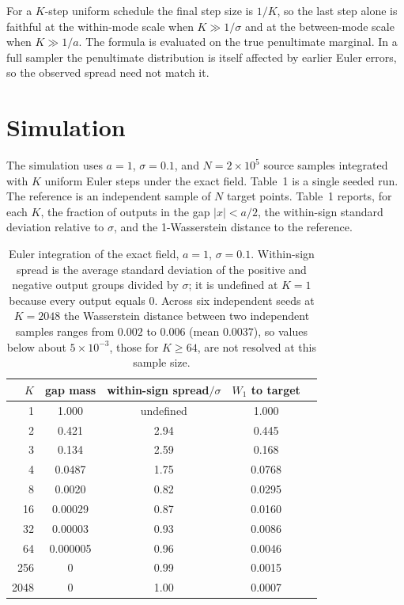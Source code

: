 \documentclass[11pt]{article}
\theoremstyle{definition}
\begin{document}
For a $K$-step uniform schedule the final step size is $1/K$, so the last step alone is faithful at the within-mode scale when $K\gg1/\sigma$ and at the between-mode scale when $K\gg1/a$. The formula is evaluated on the true penultimate marginal. In a full sampler the penultimate distribution is itself affected by earlier Euler errors, so the observed spread need not match it.

\section{Simulation}

The simulation uses $a=1$, $\sigma=0.1$, and $N=2\times10^5$ source samples integrated with $K$ uniform Euler steps under the exact field. Table~1 is a single seeded run. The reference is an independent sample of $N$ target points. Table~1 reports, for each $K$, the fraction of outputs in the gap $|x|<a/2$, the within-sign standard deviation relative to $\sigma$, and the 1-Wasserstein distance to the reference.

\begin{table}[t]
\centering
\caption{Euler integration of the exact field, $a=1$, $\sigma=0.1$. Within-sign spread is the average standard deviation of the positive and negative output groups divided by $\sigma$; it is undefined at $K=1$ because every output equals $0$. Across six independent seeds at $K=2048$ the Wasserstein distance between two independent samples ranges from $0.002$ to $0.006$ (mean $0.0037$), so values below about $5\times10^{-3}$, those for $K\ge64$, are not resolved at this sample size.}
\begin{tabular}{rcccc}
\toprule
$K$ & gap mass & within-sign spread$/\sigma$ & $W_1$ to target \\
\midrule
1    & 1.000   & undefined & 1.000 \\
2    & 0.421   & 2.94 & 0.445 \\
3    & 0.134   & 2.59 & 0.168 \\
4    & 0.0487  & 1.75 & 0.0768 \\
8    & 0.0020  & 0.82 & 0.0295 \\
16   & 0.00029 & 0.87 & 0.0160 \\
32   & 0.00003 & 0.93 & 0.0086 \\
64   & 0.000005 & 0.96 & 0.0046 \\
256  & 0 & 0.99 & 0.0015 \\
2048 & 0 & 1.00 & 0.0007 \\
\bottomrule
\end{tabular}
\end{table}
\end{document}

